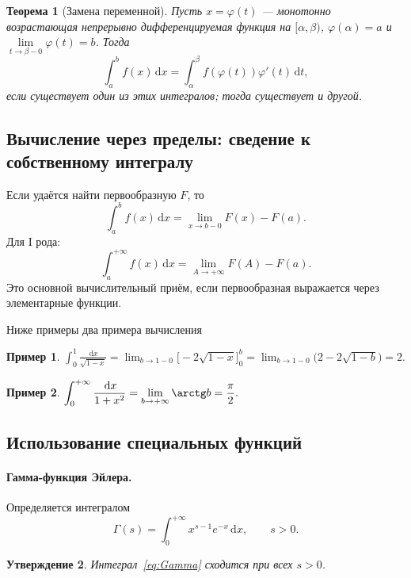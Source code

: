 \documentclass[coursework, och, times]{SCWorks1}
\newtheorem{theorem}{Теорема}
\newtheorem{proposition}[theorem]{Утверждение}
\newtheorem{example}{Пример}
\newcommand{\dd}{\,\mathrm{d}}
\begin{document}
\begin{theorem}[Замена переменной]
Пусть \(x=\varphi(t)\) — монотонно возрастающая непрерывно дифференцируемая функция на \([\alpha,\beta)\), \(\varphi(\alpha)=a\) и\\ \(\lim\limits_{t\to\beta-0}\varphi(t)=b\). Тогда
\[
\int_a^b f(x)\dd x=\int_\alpha^\beta f(\varphi(t))\varphi'(t)\dd t,
\]
если существует один из этих интегралов; тогда существует и другой.
\end{theorem}


\subsection{Вычисление через пределы: сведение к собственному интегралу}

Если удаётся найти первообразную \(F\), то
\[
\int_a^b f(x)\dd x=\lim_{x\to b-0}F(x)-F(a).
\]
Для I рода:
\[
\int_a^{+\infty}f(x)\dd x=\lim_{A\to+\infty}F(A)-F(a).
\]
Это основной вычислительный приём, если первообразная выражается через элементарные функции.

Ниже примеры два примера вычисления \cite{demidovich}
\begin{example}
$\displaystyle\int_0^1\frac{\dd x}{\sqrt{1-x}} = \lim_{b\to1-0}\bigl[-2\sqrt{1-x}\bigr]_0^b = \lim_{b\to1-0}\bigl(2-2\sqrt{1-b}\bigr)=2.$
\end{example}

\begin{example}
$\displaystyle\int_0^{+\infty}\frac{\dd x}{1+x^2}=\lim_{b\to+\infty}\arctg b = \frac{\pi}{2}.$
\end{example}


\subsection{Использование специальных функций}

\paragraph{Гамма-функция Эйлера.} Определяется интегралом \cite{zorich2}
\begin{equation}\label{eq:Gamma}
\Gamma(s)=\int_0^{+\infty}x^{s-1}e^{-x}\dd x,\qquad s>0.
\end{equation}

\begin{proposition}
Интеграл~\eqref{eq:Gamma} сходится при всех $s>0$.
\end{proposition}
\end{document}
